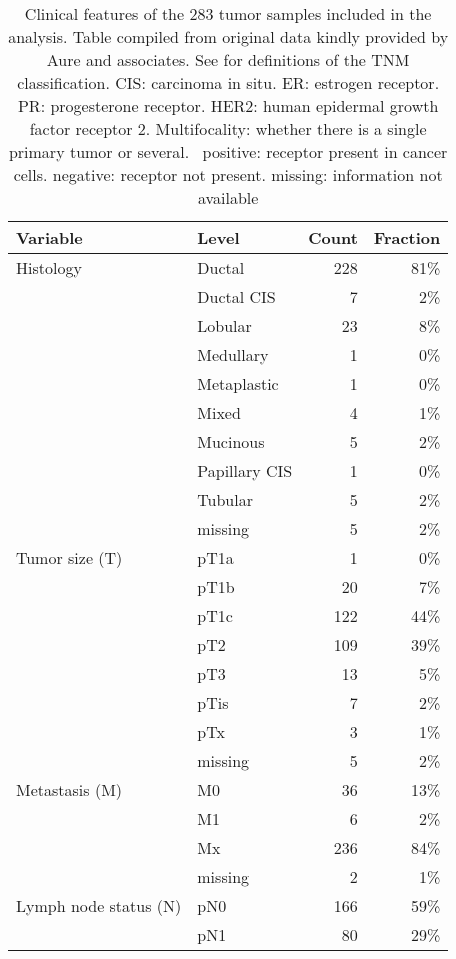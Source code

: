 \begin{table}[ht]
\centering
\caption{
Clinical features of the 283 tumor samples included in the analysis.
Table compiled from original data kindly provided by Aure and associates.
See \citep{Tavassoli2003} for definitions of the TNM classification.
CIS: carcinoma in situ. ER: estrogen receptor. PR: progesterone receptor.
HER2: human epidermal growth factor receptor 2. Multifocality: whether there is a single primary tumor or several. \
positive: receptor present in cancer cells. negative: receptor not present.
missing: information not available
\label{clinical-data}
} 
\begingroup\footnotesize
\begin{tabular}{llrr}
  \hline
Variable & Level & Count & Fraction \\ 
  \hline
Histology & Ductal & 228 & 81\% \\ 
   & Ductal CIS & 7 & 2\% \\ 
   & Lobular & 23 & 8\% \\ 
   & Medullary & 1 & 0\% \\ 
   & Metaplastic & 1 & 0\% \\ 
   & Mixed & 4 & 1\% \\ 
   & Mucinous & 5 & 2\% \\ 
   & Papillary CIS & 1 & 0\% \\ 
   & Tubular & 5 & 2\% \\ 
   & missing & 5 & 2\% \\ 
Tumor size (T) & pT1a & 1 & 0\% \\ 
   & pT1b & 20 & 7\% \\ 
   & pT1c & 122 & 44\% \\ 
   & pT2 & 109 & 39\% \\ 
   & pT3 & 13 & 5\% \\ 
   & pTis & 7 & 2\% \\ 
   & pTx & 3 & 1\% \\ 
   & missing & 5 & 2\% \\ 
Metastasis (M) & M0 & 36 & 13\% \\ 
   & M1 & 6 & 2\% \\ 
   & Mx & 236 & 84\% \\ 
   & missing & 2 & 1\% \\ 
Lymph node status (N) & pN0 & 166 & 59\% \\ 
   & pN1 & 80 & 29\% \\ 

\end{tabular}
\end{table}
